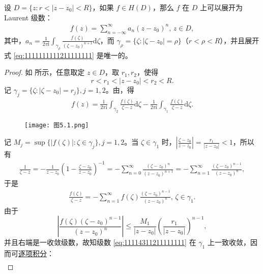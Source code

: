 \documentclass[../../main.tex]{subfiles}
\begin{document}
\begin{theorem}\label{theorem:定理5.1.2}
设 \( D = \{ z: r < |z - z_0| < R \} \)，如果 \( f \in H(D) \)，那么 \( f \) 在 \( D \) 上可以展开为 Laurent 级数：
\begin{align}
f(z) = \sum_{n = -\infty}^{\infty} a_n (z - z_0)^n, \, z \in D, \label{eq:1111111111211111111}
\end{align}
其中，\( a_n = \frac{1}{2\pi \mathrm{i}} \int_{\gamma_{\rho}} \frac{f(\zeta)}{(\zeta - z_0)^{n + 1}} \mathrm{d}\zeta \)，而 \( \gamma_{\rho} = \{ \zeta: |\zeta - z_0| = \rho \} \)（\( r < \rho < R \)），并且展开式 \eqref{eq:1111111111211111111} 是唯一的。
\end{theorem}
\begin{proof}
如 所示，任意取定 \( z \in D \)，取 \( r_1, r_2 \)，使得
\[
r < r_1 < |z - z_0| < r_2 < R.
\]
记 \( \gamma_j = \{ \zeta: |\zeta - z_0| = r_j \}, j = 1, 2 \)。由，得
\begin{align}
f(z) = \frac{1}{2\pi \mathrm{i}} \int_{\gamma_2} \frac{f(\zeta)}{\zeta - z} \mathrm{d}\zeta - \frac{1}{2\pi \mathrm{i}} \int_{\gamma_1} \frac{f(\zeta)}{\zeta - z} \mathrm{d}\zeta. \label{eq:1111111311211111111}
\end{align}
\begin{figure}[H]
\centering
\texttt{[image: 图5.1.png]}
\caption{}
\label{figure:图5.1}
\end{figure}
记 \( M_j = \sup \{ |f(\zeta)|: \zeta \in \gamma_j \}, j = 1, 2 \)。当 \( \zeta \in \gamma_1 \) 时，\( \left| \frac{\zeta - z_0}{z - z_0} \right| = \frac{r_1}{|z - z_0|} < 1 \)，所以有
\begin{align*}
\frac{1}{\zeta - z} = -\frac{1}{z - z_0} \left( 1 - \frac{\zeta - z_0}{z - z_0} \right)^{-1} = -\sum_{n = 0}^{\infty} \frac{(\zeta - z_0)^n}{(z - z_0)^{n + 1}} = -\sum_{n = 1}^{\infty} \frac{(\zeta - z_0)^{n - 1}}{(z - z_0)^n},
\end{align*}
于是
\begin{align}
\frac{f(\zeta)}{\zeta - z} = -\sum_{n = 1}^{\infty} f(\zeta) \frac{(\zeta - z_0)^{n - 1}}{(z - z_0)^n}, \, \zeta \in \gamma_1. \label{eq:11114311211111111}
\end{align}
由于
\[
\left| \frac{f(\zeta)(\zeta - z_0)^{n - 1}}{(z - z_0)^n} \right| \leqslant  \frac{M_1}{|z - z_0|} \left( \frac{r_1}{|z - z_0|} \right)^{n - 1},
\]
并且右端是一收敛级数，故知级数 \eqref{eq:11114311211111111} 在 \( \gamma_1 \) 上一致收敛，因而可\hyperref[theorem:定理4.1.5]{逐项积分}：
\begin{align}

\end{align}
\end{proof}
\end{document}

